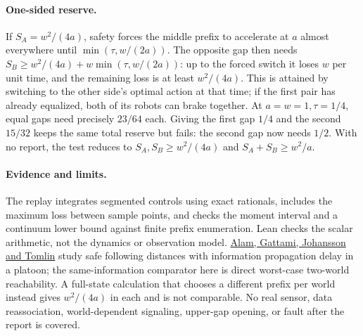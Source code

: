 \documentclass[11pt]{article}
\begin{document}
\paragraph{One-sided reserve.}
If $S_A=w^2/(4a)$, safety forces the middle prefix to accelerate at $a$ almost everywhere until $\min(\tau,w/(2a))$. The opposite gap then needs $S_B\ge w^2/(4a)+w\min(\tau,w/(2a))$: up to the forced switch it loses $w$ per unit time, and the remaining loss is at least $w^2/(4a)$. This is attained by switching to the other side's optimal action at that time; if the first pair has already equalized, both of its robots can brake together. At $a=w=1,\tau=1/4$, equal gaps need precisely $23/64$ each. Giving the first gap $1/4$ and the second $15/32$ keeps the same total reserve but fails: the second gap now needs $1/2$. With no report, the test reduces to $S_A,S_B\ge w^2/(4a)$ and $S_A+S_B\ge w^2/a$.

\paragraph{Evidence and limits.}
The replay integrates segmented controls using exact rationals, includes the maximum loss between sample points, and checks the moment interval and a continuum lower bound against finite prefix enumeration. Lean checks the scalar arithmetic, not the dynamics or observation model. \href{https://people.eecs.berkeley.edu/~tomlin/papers/AGJT14.pdf}{Alam, Gattami, Johansson and Tomlin} study safe following distances with information propagation delay in a platoon; the same-information comparator here is direct worst-case two-world reachability. A full-state calculation that chooses a different prefix per world instead gives $w^2/(4a)$ in each and is not comparable. No real sensor, data reassociation, world-dependent signaling, upper-gap opening, or fault after the report is covered.
\end{document}
